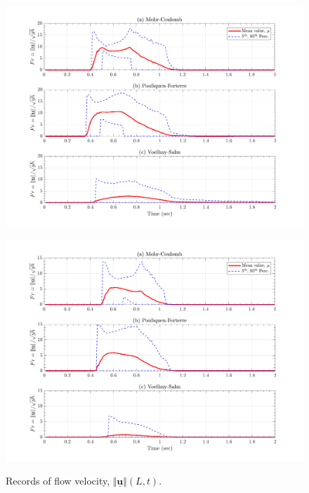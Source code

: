 \documentclass{article}
\begin{document}
\begin{figure}[H]
	\begin{minipage}[b]{0.5\linewidth}
    	\centering
    	\includegraphics[width=1\textwidth]{InclinedPlane/Froude/Fr_L3.png}
    	\label{fig:Ramp-L3-Fr}
	\end{minipage}
	\begin{minipage}[b]{0.5\linewidth}
		\centering
		\includegraphics[width=1\textwidth]{InclinedPlane/Froude/Fr_L4.png}
    	\label{fig:Ramp-L4-Fr}
    \end{minipage}
    \caption{Records of flow velocity, $\Vert \underline{\mathbf{u}} \Vert(L,t)$.}
    \label{fig:Ramp-LM-Fr}
\end{figure}
\end{document}
